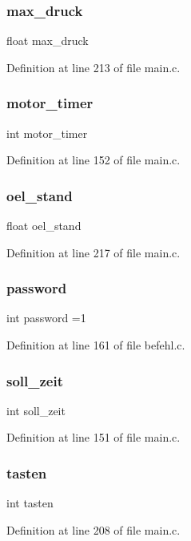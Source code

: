 \subsubsection{max\+\_\+druck}
{\footnotesize\ttfamily float max\+\_\+druck}



Definition at line 213 of file main.\+c.

\mbox{\label{befehl_8c_ae835483f889f5b6b2f9fd7b4550b366c}} 
\subsubsection{motor\+\_\+timer}
{\footnotesize\ttfamily int motor\+\_\+timer}



Definition at line 152 of file main.\+c.

\mbox{\label{befehl_8c_a5c5872dd96f0fa71559e07608865fa8a}} 
\subsubsection{oel\+\_\+stand}
{\footnotesize\ttfamily float oel\+\_\+stand}



Definition at line 217 of file main.\+c.

\mbox{\label{befehl_8c_a04d82f0979002e66f5d4928a11ec04a9}} 
\subsubsection{password}
{\footnotesize\ttfamily int password =1}



Definition at line 161 of file befehl.\+c.

\mbox{\label{befehl_8c_a55e38ae00c77b3a41087dfbf0eddacd6}} 
\subsubsection{soll\+\_\+zeit}
{\footnotesize\ttfamily int soll\+\_\+zeit}



Definition at line 151 of file main.\+c.

\mbox{\label{befehl_8c_a00bbc97133a4f3f4b6a66694962828e4}} 
\subsubsection{tasten}
{\footnotesize\ttfamily int tasten}



Definition at line 208 of file main.\+c.

